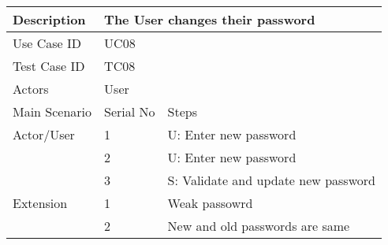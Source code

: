 \begin{table}[]
    \centering
    \begin{tabular}{|l|llll|}
        \hline
        Description   & \multicolumn{4}{l|}{The User changes their password}                                                            \\ \hline
        Use Case ID   & \multicolumn{4}{l|}{UC08}                                                                                       \\ \hline
        Test Case ID  & \multicolumn{4}{l|}{TC08}                                                                                       \\ \hline
        Actors        & \multicolumn{4}{l|}{User}                                                                                       \\ \hline
        Main Scenario & \multicolumn{1}{l|}{Serial No}                       & \multicolumn{3}{l|}{Steps}                               \\ \hline
        Actor/User    & \multicolumn{1}{l|}{1}                               & \multicolumn{3}{l|}{U: Enter new password}               \\ \hline
                      & \multicolumn{1}{l|}{2}                               & \multicolumn{3}{l|}{U: Enter new password}               \\ \hline
                      & \multicolumn{1}{l|}{3}                               & \multicolumn{3}{l|}{S: Validate and update new password} \\ \hline
        Extension     & \multicolumn{1}{l|}{1}                               & \multicolumn{3}{l|}{Weak passowrd}                       \\ \hline
                      & \multicolumn{1}{l|}{2}                               & \multicolumn{3}{l|}{New and old passwords are same}      \\ \hline
    \end{tabular}
\end{table}
\newpage

